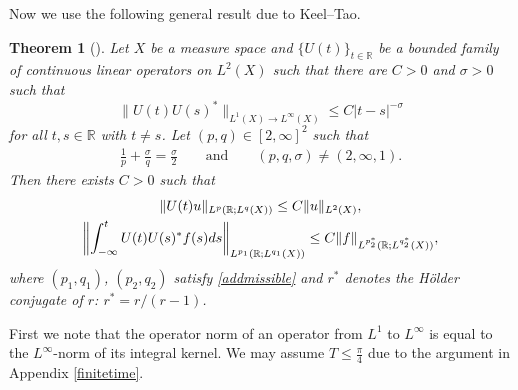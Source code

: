 \documentclass[10pt,a4paper]{article}
\numberwithin{equation}{section}
\newtheorem{Theorem}{Theorem}[section]
\def\R{\mathbb{R}}%
\def\s{\sigma}
\begin{document}
Now we use the following general result due to Keel--Tao.




\begin{Theorem}[\cite{KT}]\label{KeelTao}
Let $X$ be a measure space and $\{U(t)\}_{t\in \R}$ be a bounded family of continuous linear operators on $L^2(X)$ such that there are $C>0$ and $\s>0$ such that
\[
\|U(t)U(s)^*\|_{L^1(X)\to L^{\infty}(X)}\leq C|t-s|^{-\s}
\]
 for all $t,s\in \R$ with $t\neq s$. Let $(p,q)\in [2,\infty]^2$ such that
\begin{align}\label{addmissible}
\frac{1}{p}+\frac{\s}{q}=\frac{\s}{2} \qquad \text{and}\qquad (p,q,\s)\neq (2,\infty,1).
\end{align}
Then there exists $C>0$ such that
\begin{gather*}
\|U(t)u\|_{L^p(\R; L^q(X))}\leq C\|u\|_{L^2(X)},\\
 \left\|\int_{-\infty}^tU(t)U(s)^*f(s){\rm d}s \right\|_{L^{p_1}(\R; L^{q_1}(X))} \leq C\|f\|_{L^{p_2^*}(\R; L^{q_2^*}(X))},
\end{gather*}
where $(p_1,q_1)$, $(p_2,q_2)$ satisfy \eqref{addmissible} and $r^*$ denotes the H\"older conjugate of $r$: $r^*=r/(r-1)$.



\end{Theorem}





First we note that the operator norm of an operator from $L^1$ to $L^{\infty}$ is equal to the $L^{\infty}$-norm of its integral kernel.
We may assume $T\leq \frac{\pi}{4}$ due to the argument in Appendix \ref{finitetime}.
\end{document}
